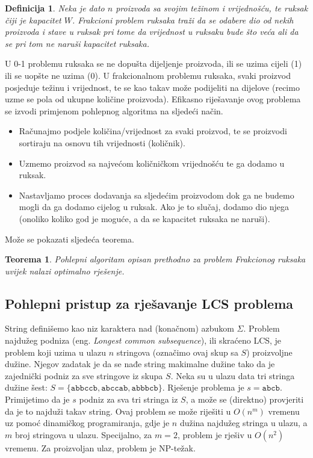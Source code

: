 \documentclass[a4paper, utf8, 11pt, colorlinks]{book}
\newtheorem{definition}{Definicija}
\newtheorem{thm}{Teorema}
\begin{document}
\begin{definition}
  Neka je dato $n$ proizvoda sa svojim  težinom i vrijednošću, 
  te ruksak čiji je kapacitet $W$. Frakcioni problem ruksaka traži da se   odabere dio od nekih proizvoda i stave u ruksak pri tome da vrijednost u ruksaku bude što veća ali da se pri tom ne naruši kapacitet ruksaka.
\end{definition}
U 0-1 problemu ruksaka se ne dopušta dijeljenje proizvoda, ili se uzima cijeli (1) ili se uopšte ne uzima (0). U frakcionalnom problemu ruksaka, svaki proizvod posjeduje težinu i vrijednost, te se kao takav može podijeliti na dijelove (recimo uzme se pola od ukupne količine proizvoda). Efikasno riješavanje ovog problema se izvodi primjenom pohlepnog algoritma na sljedeći način. 
\begin{itemize}
	\item Računajmo podjele količina/vrijednost za svaki proizvod, te se proizvodi  sortiraju na osnovu tih vrijednosti (količnik).   \item Uzmemo proizvod sa najvećom količničkom vrijednošću te ga dodamo u ruksak. 
	\item Nastavljamo proces dodavanja sa sljedećim proizvodom dok ga ne budemo mogli da ga  dodamo cijelog u ruksak.    Ako je to slučaj, dodamo dio njega (onoliko koliko god je moguće, a da se kapacitet ruksaka ne naruši). 
\end{itemize}
Može se pokazati sljedeća teorema. 

\begin{thm}
      Pohlepni algoritam opisan prethodno za problem Frakcionog ruksaka uvijek nalazi optimalno rješenje.
\end{thm}
\subsection{Pohlepni pristup za rješavanje LCS problema}

String definišemo kao niz karaktera nad (konačnom) azbukom $\Sigma$. 
Problem najdužeg podniza (eng. \emph{Longest common subsequence}), ili skraćeno LCS, je problem koji uzima u ulazu  $n$ stringova (označimo ovaj skup sa $S$) proizvoljne dužine. Njegov zadatak je da se nađe string makimalne dužine tako da je  zajednički podniz za sve stringove iz skupa $S$.  Neka su u ulazu data tri stringa dužine šest: $S = \{  \texttt{abbccb}, \texttt{abccab}, \texttt{abbbcb}   \}$. Rješenje problema je $s=\texttt{abcb}$. Primijetimo da je $s$ podniz za sva tri stringa iz $S$, a može se (direktno) provjeriti da je to najduži takav string. 
 Ovaj problem se može riješiti u $O(n^m)$ vremenu uz pomoć dinamičkog programiranja, gdje je $n$ dužina najdužeg stringa u ulazu, a $m$ broj stringova u ulazu. Specijalno, za  $m=2$, problem je rješiv u $O(n^2)$ vremenu. Za proizvoljan ulaz, problem je NP-težak.  
\end{document}
